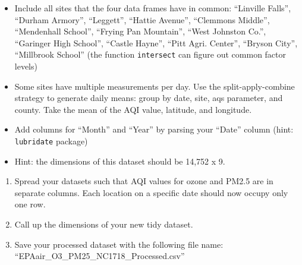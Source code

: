 \documentclass[]{article}
\providecommand{\tightlist}{%
  \setlength{\itemsep}{0pt}\setlength{\parskip}{0pt}}
\begin{document}
\begin{itemize}
\tightlist
\item
  Include all sites that the four data frames have in common: ``Linville
  Falls'', ``Durham Armory'', ``Leggett'', ``Hattie Avenue'', ``Clemmons
  Middle'', ``Mendenhall School'', ``Frying Pan Mountain'', ``West
  Johnston Co.'', ``Garinger High School'', ``Castle Hayne'', ``Pitt
  Agri. Center'', ``Bryson City'', ``Millbrook School'' (the function
  \texttt{intersect} can figure out common factor levels)
\item
  Some sites have multiple measurements per day. Use the
  split-apply-combine strategy to generate daily means: group by date,
  site, aqs parameter, and county. Take the mean of the AQI value,
  latitude, and longitude.
\item
  Add columns for ``Month'' and ``Year'' by parsing your ``Date'' column
  (hint: \texttt{lubridate} package)
\item
  Hint: the dimensions of this dataset should be 14,752 x 9.
\end{itemize}

\begin{enumerate}
\def\labelenumi{\arabic{enumi}.}
\setcounter{enumi}{8}
\tightlist
\item
  Spread your datasets such that AQI values for ozone and PM2.5 are in
  separate columns. Each location on a specific date should now occupy
  only one row.
\item
  Call up the dimensions of your new tidy dataset.
\item
  Save your processed dataset with the following file name:
  ``EPAair\_O3\_PM25\_NC1718\_Processed.csv''
\end{enumerate}
\end{document}
